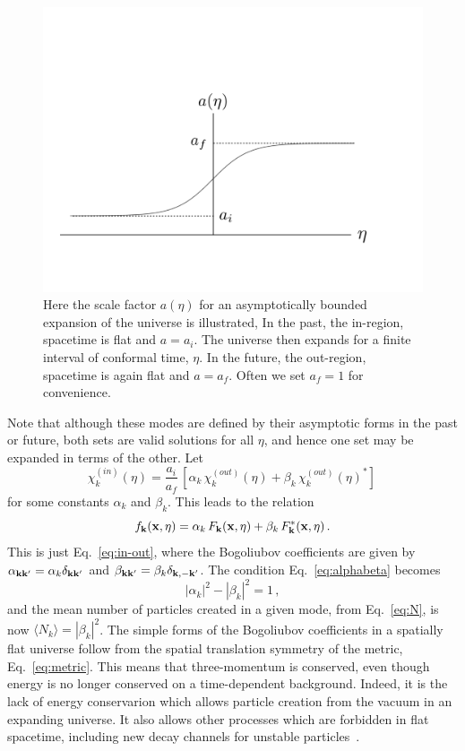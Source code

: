 \documentclass[12pt,onecolumn,eqsecnum,floats,aps,prd,floatfix,titlepage]{revtex4-2}
\begin{document}
\begin{figure}[htbp]
\includegraphics[scale=0.4]{bounded-expansion}
\caption{Here the scale factor $a(\eta)$ for an asymptotically bounded expansion of the universe is illustrated,
In the past, the in-region, spacetime is flat and $a=a_i$. The universe then expands for a finite interval of conformal
time, $\eta$. In the future, the out-region, spacetime is again flat and  $a=a_f$. Often we set $a_f = 1$ for convenience.}
\label{fig:boundedexpansion}
\end{figure}


Note that although these modes are defined by their asymptotic forms in the past or future, both sets are
valid solutions for all $\eta$, and hence one set may be expanded in terms of the other. Let
 \begin{equation}
  \chi_k^{(in)}(\eta) = \frac{a_i}{a_f}\, [\alpha_k\, \chi_k^{(out)}(\eta) + \beta_k\, \chi_k^{(out)}(\eta)^*]\,
  \label{eq:chi-alphabeta}
 \end{equation}
for some constants $\alpha_k$ and $\beta_k$. This leads to the relation
 \begin{equation}
 f_{\bf k}({\bf x},\eta)= \alpha_k\,  F_{\bf k}({\bf x},\eta) + \beta_k \, F^*_{\bf k}({\bf x},\eta) \,.
 \end{equation}
This is just Eq.~\eqref{eq:in-out}, where  the Bogoliubov coefficients are given 
by $\alpha_{\bf k k'} = \alpha_k \delta_{\bf k k'}$ and $\beta_{\bf k k'} = \beta_k \delta_{\bf k, -k'}$.
The condition Eq.~\eqref{eq:alphabeta} becomes
 \begin{equation}
 |\alpha_k|^2 -  |\beta_k|^2 = 1\,,
 \label{eq:alphabeta2}
 \end{equation}
 and the mean number of particles created in a given mode, from Eq.~\eqref{eq:N}, is now $\langle N_k \rangle =  |\beta_k|^2$.
 The simple forms of the Bogoliubov coefficients in a spatially flat universe follow from the spatial
 translation symmetry of the metric, Eq.~\eqref{eq:metric}. This means that three-momentum is conserved,
 even though energy is no longer conserved on a time-dependent background.  Indeed, it is the lack of energy conservarion 
 which allows particle creation from the vacuum in an expanding universe. It also allows other processes which are forbidden
 in flat spacetime, including new decay channels for unstable particles~\cite{Ford82,Lankinen18}. 
 
\end{document}
